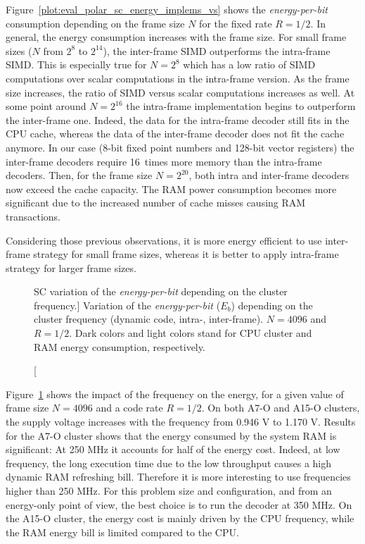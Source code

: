 Figure~\ref{plot:eval_polar_sc_energy_implems_vs} shows the
\emph{energy-per-bit} consumption depending on the frame size $N$ for the fixed
rate $R = 1/2$. In general, the energy consumption increases with the frame
size. For small frame sizes ($N$ from $2^{8}$ to $2^{14}$), the inter-frame SIMD
outperforms the intra-frame SIMD. This is especially true for $N = 2^8$ which
has a low ratio of SIMD computations over scalar computations in the intra-frame
version. As the frame size increases, the ratio of SIMD versus scalar
computations increases as well. At some point around $N = 2^{16}$ the
intra-frame implementation begins to outperform the inter-frame one. Indeed, the
data for the intra-frame decoder still fits in the CPU cache, whereas the data
of the inter-frame decoder does not fit the cache anymore. In our case (8-bit
fixed point numbers and 128-bit vector registers) the inter-frame decoders
require 16~times more memory than the intra-frame decoders. Then, for the frame
size $N = 2^{20}$, both intra and inter-frame decoders now exceed the cache
capacity. The RAM power consumption becomes more significant due to the
increased number of cache misses causing RAM transactions.

Considering those previous observations, it is more energy efficient to use
inter-frame strategy for small frame sizes, whereas it is better to apply
intra-frame strategy for larger frame sizes.

\begin{figure}[htp]
  \centering
  \quad
  \caption
    [SC variation of the \emph{energy-per-bit} depending on the cluster
    frequency.]
    {Variation of the \emph{energy-per-bit} ($E_b$) depending on the cluster
    frequency (dynamic code, intra-, inter-frame). $N = 4096$ and $R = 1/2$.
    Dark colors and light colors stand for CPU cluster and RAM energy
    consumption, respectively.}
  \label{plot:eval_polar_sc_energy_freq}
\end{figure}

Figure~\ref{plot:eval_polar_sc_energy_freq} shows the impact of the frequency on
the energy, for a given value of frame size $N=4096$ and a code rate $R=1/2$. On
both A7-O and A15-O clusters, the supply voltage increases with the frequency
from 0.946 V to 1.170 V. Results for the A7-O \little cluster shows that the
energy consumed by the system RAM is significant: At 250 MHz it accounts for
half of the energy cost. Indeed, at low frequency, the long execution time due
to the low throughput causes a high dynamic RAM refreshing bill. Therefore it is
more interesting to use frequencies higher than 250 MHz. For this problem size
and configuration, and from an energy-only point of view, the best choice is to
run the decoder at 350 MHz. On the A15-O \bigARM cluster, the energy cost is
mainly driven by the CPU frequency, while the RAM energy bill is limited
compared to the CPU.

